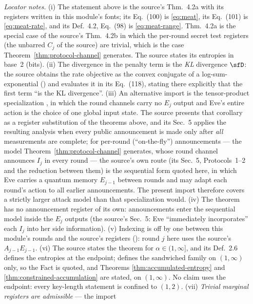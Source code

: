 \begin{fact}
\emph{Locator notes.} (i) The statement above is the source's
Thm.~4.2a with its registers written in this module's fonts; its
Eq.~(100) is \eqref{eq:meat}, its Eq.~(101) is \eqref{eq:meat-rate},
and its Def.~4.2, Eq.~(98) is \eqref{eq:meat-range}. Thm.~4.2a is the
special case of the source's Thm.~4.2b in which the per-round secret
test registers (the unbarred $C_j$ of the source) are trivial, which is
the case Theorem~\ref{thm:protocol-channel} generates. The source states
its entropies in base~2
(bits). (ii) The divergence in the penalty term is the \emph{KL}
divergence $\sfD$: the source obtains the rate objective as the convex
conjugate of a log-sum-exponential
(\cite[Lemma~4.11, Eqs.~(113)--(114)]{arqand2025meat}) and evaluates
it in its Eq.~(118), stating there explicitly that the first term ``is
the KL divergence''.
(iii) An alternative import is the tensor-product
specialization \cite[Cor.~4.2, Eq.~(137)]{arqand2025meat}, in which
the round channels carry no $E_j$ output and Eve's entire action is
the choice of one global input state. The source presents that
corollary as a register substitution of the theorems above, and its
Sec.~5 applies the resulting analysis when every public announcement
is made only after \emph{all} measurements are complete; for per-round
(``on-the-fly'') announcements --- the model
Theorem~\ref{thm:protocol-channel} generates, whose round channel
announces $I_j$ in every round --- the source's own
route (its Sec.~5, Protocols~1--2 and the reduction between them) is
the sequential form quoted here, in which Eve carries a quantum memory
$E_{j-1}$ between rounds and may adapt each round's action to all
earlier announcements. The present import therefore covers a strictly
larger attack model than that specialization would. (iv) The theorem has no
announcement register of its own: announcements enter the sequential
model inside the $E_j$ outputs (the source's Sec.~5: Eve
``immediately incorporates'' each $I_j$ into her side information).
(v) Indexing is off by one between this module's rounds and the
source's registers (\cite[Rem.~5.1]{arqand2025meat}): round $j$ here
uses the source's $A_{j-1}E_{j-1}$. (vi) The source states the
theorem for $\alpha\in(1,\infty]$, and its Def.~2.6 defines the
entropies at the endpoint; 
defines the sandwiched family on $(1,\infty)$ only, so the Fact is
quoted, and Theorems \ref{thm:accumulated-entropy} and \ref{thm:constrained-accumulation} are stated, on
$(1,\infty)$. No claim uses the endpoint: every key-length statement
is confined to $(1,2)$.
(vii) \emph{Trivial marginal registers are admissible} --- the import

\end{fact}
